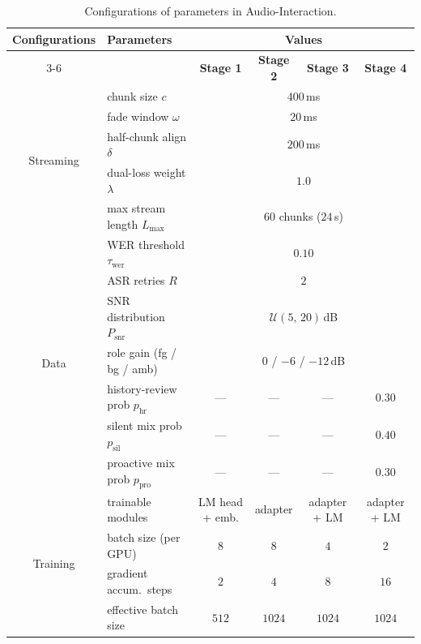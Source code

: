 \documentclass{article}
\begin{document}
\begin{table}[H]
\centering
\caption{Configurations of parameters in Audio-Interaction.}
\label{tab:hyperparams}
\footnotesize
\setlength{\tabcolsep}{4pt}
\renewcommand{\arraystretch}{1.05}
\begin{tabular}{c|l|cccc}
\toprule
\textbf{Configurations} & \textbf{Parameters} & \multicolumn{4}{c}{\textbf{Values}} \\
\cmidrule(lr){3-6}
 &  & \textbf{Stage 1} & \textbf{Stage 2} & \textbf{Stage 3} & \textbf{Stage 4} \\
\midrule
\multirow{5}{*}{Streaming}
  & chunk size $c$                   & \multicolumn{4}{c}{$400$\,ms} \\
  & fade window $\omega$             & \multicolumn{4}{c}{$20$\,ms} \\
  & half-chunk align $\delta$        & \multicolumn{4}{c}{$200$\,ms} \\
  & dual-loss weight $\lambda$       & \multicolumn{4}{c}{$1.0$} \\
  & max stream length $L_{\max}$     & \multicolumn{4}{c}{$60$ chunks ($24$\,s)} \\
\midrule
\multirow{7}{*}{Data}
  & WER threshold $\tau_{\text{wer}}$ & \multicolumn{4}{c}{$0.10$} \\
  & ASR retries $R$                  & \multicolumn{4}{c}{$2$} \\
  & SNR distribution $P_{\text{snr}}$ & \multicolumn{4}{c}{$\mathcal{U}(5,\,20)$\,dB} \\
  & role gain (fg / bg / amb)        & \multicolumn{4}{c}{$0$ / $-6$ / $-12$\,dB} \\
  & history-review prob $p_{\text{hr}}$  & --- & --- & --- & $0.30$ \\
  & silent mix prob $p_{\text{sil}}$     & --- & --- & --- & $0.40$ \\
  & proactive mix prob $p_{\text{pro}}$  & --- & --- & --- & $0.30$ \\
\midrule
\multirow{11}{*}{Training}
  & trainable modules         & LM head + emb.       & adapter              & adapter + LM         & adapter + LM \\
  & batch size (per GPU)      & $8$                  & $8$                  & $4$                  & $2$ \\
  & gradient accum.\ steps    & $2$                  & $4$                  & $8$                  & $16$ \\
  & effective batch size      & $512$                & $1024$               & $1024$               & $1024$ \\

\end{tabular}
\end{table}
\end{document}
